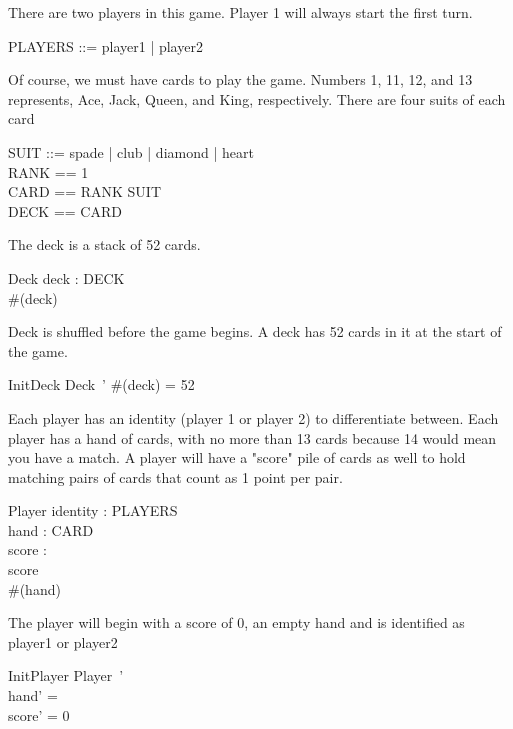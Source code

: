 \documentclass{article}
\begin{document}
There are two players in this game. Player 1 will always start the first turn.
\begin{zed} 
    PLAYERS ::= player1 | player2
\end{zed}

Of course, we must have cards to play the game.
Numbers 1, 11, 12, and 13 represents, Ace, Jack, Queen, and King, respectively.
There are four suits of each card
\begin{zed}
    SUIT ::= spade | club | diamond | heart \\
    RANK == 1 \\
    CARD == RANK \cross SUIT \\
    DECK == \power CARD \\
\end{zed}
\clearpage
The deck is a stack of 52 cards. 
\begin{schema}{Deck}
    deck : DECK \\
    \where
    \#(deck)  \\  
\end{schema}

Deck is shuffled before the game begins. A deck has 52 cards in it at the
start of the game.
\begin{schema}{InitDeck}
    Deck~'
    \where
    \#(deck) = 52
\end{schema}

Each player has an identity (player 1 or player 2) to
differentiate between. Each player has a hand of cards, with
no more than 13 cards because 14 would mean you have a match.
A player will have a "score" pile of cards as well to hold
matching pairs of cards that count as 1 point per pair.

\begin{schema}{Player}
    identity : PLAYERS \\
    hand : \power CARD \\
    score : \nat \\
    \where
    score  \\
    \#(hand) 
\end{schema}

The player will begin with a score of 0, an empty hand
and is identified as player1 or player2
\begin{schema}{InitPlayer}
    Player~'\\
    \where
    hand' = \emptyset \\
    score' = 0
\end{schema}
\end{document}
